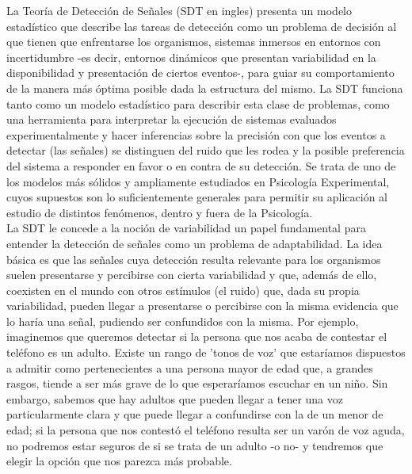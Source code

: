 La Teoría de Detección de Señales (SDT en ingles) presenta un modelo estadístico que describe las tareas de detección como un problema de decisión al que tienen que enfrentarse los organismos, sistemas inmersos en entornos con incertidumbre -es decir, entornos dinámicos que presentan variabilidad en la disponibilidad y presentación de ciertos eventos-, para guiar su comportamiento de la manera más óptima posible dada la estructura del mismo. La SDT funciona tanto como un modelo estadístico para describir esta clase de problemas, como una herramienta para interpretar la ejecución de sistemas evaluados experimentalmente y hacer inferencias sobre la precisión con que los eventos a detectar (las señales) se distinguen del ruido que les rodea y la posible preferencia del sistema a responder en favor o en contra de su detección. Se trata de uno de los modelos más sólidos y ampliamente estudiados en Psicología Experimental, cuyos supuestos son lo suficientemente generales para permitir su aplicación al estudio de distintos fenómenos, dentro y fuera de la Psicología. \\

La SDT le concede a la noción de variabilidad un papel fundamental para entender la detección de señales como un problema de adaptabilidad. La idea básica es que las señales cuya detección resulta relevante para los organismos suelen presentarse y percibirse con cierta variabilidad y que, además de ello, coexisten en el mundo con otros estímulos (el ruido) que, dada su propia variabilidad, pueden llegar a presentarse o percibirse con la misma evidencia que lo haría una señal, pudiendo ser confundidos con la misma. Por ejemplo, imaginemos que queremos detectar si la persona que nos acaba de contestar el teléfono es un adulto. Existe un rango de 'tonos de voz' que estaríamos dispuestos a admitir como pertenecientes a una persona mayor de edad que, a grandes rasgos, tiende a ser más grave de lo que esperaríamos escuchar en un niño. Sin embargo, sabemos que hay adultos que pueden llegar a tener una voz particularmente clara y que puede llegar a confundirse con la de un menor de edad; si la persona que nos contestó el teléfono resulta ser un varón de voz aguda, no podremos estar seguros de si se trata de un adulto -o no- y tendremos que elegir la opción que nos parezca más probable.\\

